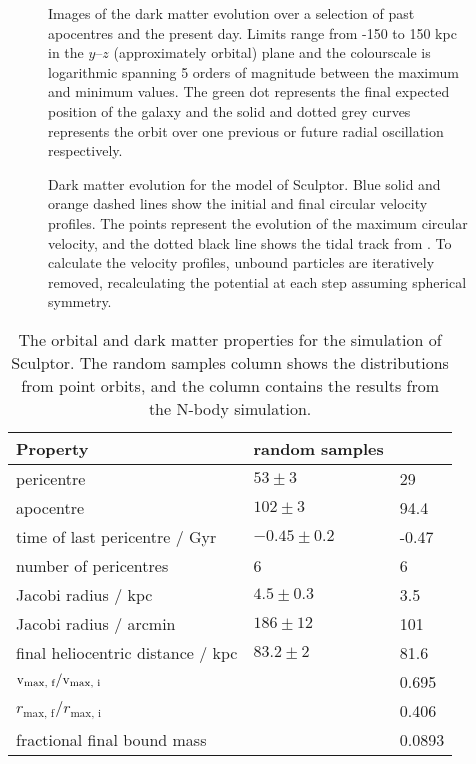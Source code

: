 \begin{figure}
\centering
{}
\caption[Sculptor simulation snapshots]{Images of the dark matter
evolution over a selection of past apocentres and the present day.
Limits range from -150 to 150 kpc in the \(y\)--\(z\) (approximately
orbital) plane and the colourscale is logarithmic spanning 5 orders of
magnitude between the maximum and minimum values. The green dot
represents the final expected position of the galaxy and the solid and
dotted grey curves represents the orbit over one previous or future
radial oscillation respectively.}\label{fig:scl_sim_images}
\end{figure}

\begin{figure}
\centering
{}
\caption[Sculptor tidal tracks]{Dark matter evolution for the
\smallperi{} model of Sculptor. Blue solid and orange dashed lines show
the initial and final circular velocity profiles. The points represent
the evolution of the maximum circular velocity, and the dotted black
line shows the tidal track from \citet{EN2021}. To calculate the
velocity profiles, unbound particles are iteratively removed,
recalculating the potential at each step assuming spherical
symmetry.}\label{fig:scl_tidal_track}
\end{figure}

\begin{table*}[t]
\centering
\caption[Simulation results for Sculptor’s dark matter]{The orbital and dark matter properties for the simulation of Sculptor. The random samples column shows the distributions from point orbits, and the \smallperi{} column contains the results from the N-body simulation. }
\label{tbl:scl_sim_results}
\begin{tabular}{lll}
\toprule
Property & random samples & \smallperi{}\\
\midrule
pericentre & $53\pm3$ & 29\\
apocentre & $102\pm3$ & 94.4\\
time of last pericentre / Gyr & $-0.45 \pm 0.2$ & -0.47\\
number of pericentres & 6 & 6\\
Jacobi radius / kpc & $4.5 \pm 0.3$ & 3.5\\
Jacobi radius / arcmin & $186\pm12$ & 101\\
final heliocentric distance / kpc & $83.2\pm2$ & 81.6\\
${\rm v}_\textrm{max, f} / {\rm v}_\textrm{max, i}$ &  & 0.695\\
$r_\textrm{max, f} / r_\textrm{max, i}$ &  & 0.406\\
fractional final bound mass &  & 0.0893\\
\bottomrule
\end{tabular}
\end{table*}

